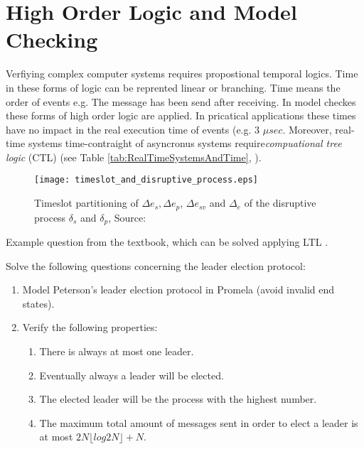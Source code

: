 \section{High Order Logic and Model Checking}
\label{sec:HighOrderLogicAndModelChecking}

Verfiying complex computer systems requires propostional temporal logics. 
Time in these forms of logic can be reprented linear or branching. Time means the order of events e.g. \glqq The message has been send after receiving. \grqq
In model checkes these forms of high order logic are applied.
In pricatical applications these times have no impact in the real execution time of events (e.g. $3$ $ \mu sec$. Moreover, real-time systems time-contraight of asyncronus systems require{\itshape compuational tree logic} (CTL) (see Table \ref{tab:RealTimeSystemsAndTime}, \cite{BK}).

\begin{figure}[h]
		\centering
		\texttt{[image: timeslot\_and\_disruptive\_process.eps]}
		\caption{Timeslot partitioning of  $\Delta e_s, \Delta e_p$, $\Delta e_{sv}$ and $\Delta_e$ of the disruptive process $\delta_s$ and $\delta_p$, Source: \cite{BK}}
		\label{fig:timeslots}
\end{figure}

Example question from the textbook, which can be solved applying LTL \cite[Chapter 5]{BK}.

Solve the following questions concerning the leader election protocol:

\begin{enumerate}
	\item Model Peterson’s leader election protocol in Promela (avoid invalid end states).
	\item  Verify the following properties:
	\begin{enumerate}	
		\item There is always at most one leader.
		\item Eventually always a leader will be elected.
		\item The elected leader will be the process with the highest number.
		\item The maximum total amount of messages sent in order to elect a leader is at most $2N \lfloor log 2 N \rfloor  + N$.
	\end{enumerate}
\end{enumerate}



